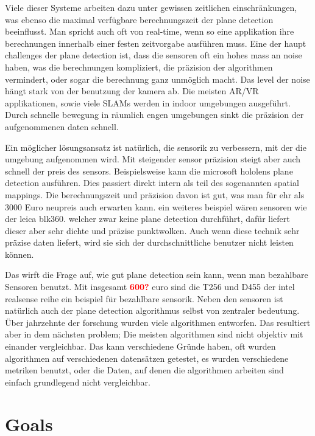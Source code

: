 \documentclass[main.tex]{subfiles}
\begin{document}
Viele dieser Systeme arbeiten dazu unter gewissen zeitlichen einschränkungen, was ebenso die maximal verfügbare berechnungszeit der plane detection beeinflusst.
Man spricht auch oft von real-time, wenn so eine applikation ihre berechnungen innerhalb einer festen zeitvorgabe ausführen muss.
Eine der haupt challenges der plane detection ist, dass die sensoren oft ein hohes mass an noise haben, was die berechnungen kompliziert, die präzision der 
algorithmen vermindert, oder sogar die berechnung ganz unmöglich macht. Das level der noise hängt stark von der benutzung der kamera ab. 
Die meisten AR/VR applikationen, sowie viele SLAMs werden in indoor umgebungen ausgeführt. Durch schnelle bewegung in räumlich engen umgebungen sinkt die 
präzision der aufgenommenen daten schnell.

Ein möglicher lösungsansatz ist natürlich, die sensorik zu verbessern, mit der die umgebung aufgenommen wird. Mit steigender sensor präzision steigt aber auch schnell der preis des sensors.
Beispielsweise kann die microsoft hololens plane detection ausführen. Dies passiert direkt intern als teil des sogenannten spatial mappings.   
Die berechnungszeit und präzision davon ist gut, was man für ehr als $3000$ Euro neupreis auch erwarten kann. ein weiteres beispiel wären sensoren wie der leica blk360. welcher zwar keine plane
detection durchführt, dafür liefert dieser aber sehr dichte und präzise punktwolken.
Auch wenn diese technik sehr präzise daten liefert, wird sie sich der durchschnittliche benutzer nicht leisten können.

Das wirft die Frage auf, wie gut plane detection sein kann, wenn man bezahlbare Sensoren benutzt. 
Mit insgesamt \textbf{\textcolor{red}{600?}} euro sind die T256 und D455 der intel realsense reihe ein beispiel für bezahlbare sensorik. 
Neben den sensoren ist natürlich auch der plane detection algorithmus selbst von zentraler bedeutung. Über jahrzehnte der forschung wurden viele algorithmen entworfen.
Das resultiert aber in dem nächsten problem; Die meisten algorithmen sind nicht objektiv mit einander vergleichbar. Das kann verschiedene Gründe haben, oft 
wurden algorithmen auf verschiedenen datensätzen getestet, es wurden verschiedene metriken benutzt, oder die Daten, auf denen die algorithmen arbeiten sind einfach grundlegend
nicht vergleichbar. 


\section{Goals}
\end{document}

